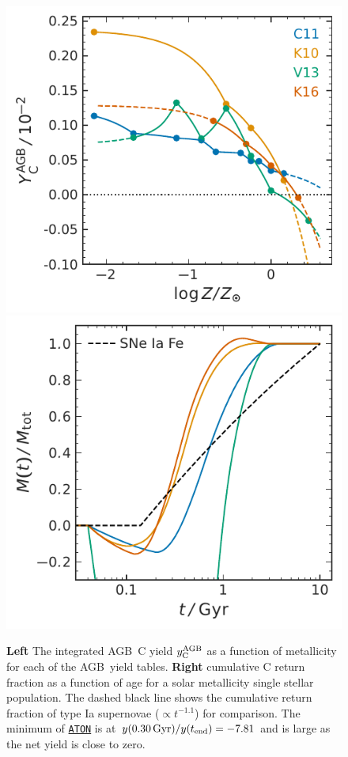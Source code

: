 \documentclass[fleqn,
usenatbib]{mnras}
\newcommand{\aton}{\texttt{\hyperlink{aton}{ATON}}}
\newcommand{\agb}{AGB}
\newcommand{\Ycagb}{{y_{\rm C}^{\rm AGB}}}
\begin{document}
\begin{figure}
    \centering
    \includegraphics{y_agb_vs_z.pdf}
    \includegraphics{y_agb_vs_t.pdf}

    \caption[]{\textbf{Left} The integrated \agb\ C yield $\Ycagb$ as a function of metallicity for each of the \agb\ yield tables.
    \textbf{Right} cumulative C return fraction as a function of age for a solar metallicity single stellar population. The dashed black line shows the cumulative return fraction of type Ia supernovae ($\propto t^{-1.1}$) for comparison. The minimum of \aton{} is at $y( 0.30\,{\rm Gyr})/y(t_{\rm end})=-7.81$ and is large as the net yield is close to zero.
}

    \label{fig:agb-ssp}

\end{figure}
\end{document}
